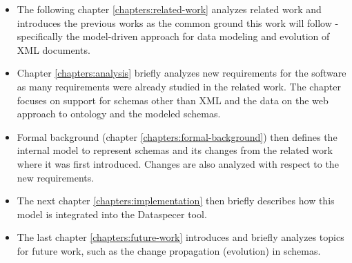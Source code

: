 \begin{itemize}
    \item The following chapter \ref{chapters:related-work} analyzes related work and introduces the previous works as the common ground this work will follow - specifically the model-driven approach for data modeling and evolution of XML documents.
    \item Chapter \ref{chapters:analysis} briefly analyzes new requirements for the software as many requirements were already studied in the related work. The chapter focuses on support for schemas other than XML and the data on the web \cite{data-on-the-web} approach to ontology and the modeled schemas.
    \item Formal background (chapter \ref{chapters:formal-background}) then defines the internal model to represent schemas and its changes from the related work where it was first introduced. Changes are also analyzed with respect to the new requirements.
    \item The next chapter \ref{chapters:implementation} then briefly describes how this model is integrated into the Dataspecer tool.
    \item The last chapter \ref{chapters:future-work} introduces and briefly analyzes topics for future work, such as the change propagation (evolution) in schemas.
\end{itemize}

